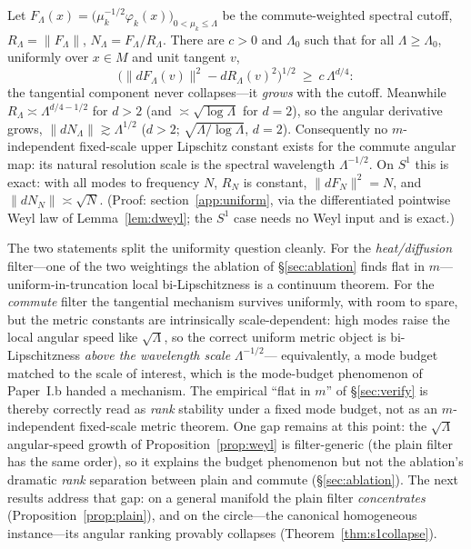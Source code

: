 \documentclass[review]{siamart220329}
\begin{document}
\begin{proposition}\label{prop:weyl}
Let $F_\Lambda(x)=\big(\mu_k^{-1/2}\varphi_k(x)\big)_{0<\mu_k\le\Lambda}$
be the commute-weighted spectral cutoff, $R_\Lambda=\lVert F_\Lambda\rVert$,
$N_\Lambda=F_\Lambda/R_\Lambda$. There are $c>0$ and $\Lambda_0$ such that for
all $\Lambda\ge\Lambda_0$, uniformly over $x\in M$ and unit tangent $v$,
\[
\big(\lVert dF_\Lambda(v)\rVert^2-dR_\Lambda(v)^2\big)^{1/2}\ \ge\ c\,\Lambda^{d/4}:
\]
the tangential component never collapses---it \emph{grows} with the cutoff.
Meanwhile $R_\Lambda\asymp\Lambda^{d/4-1/2}$ for $d>2$ (and
$\asymp\sqrt{\log\Lambda}$ for $d=2$), so the angular derivative grows,
$\lVert dN_\Lambda\rVert\gtrsim\Lambda^{1/2}$ ($d>2$;
$\sqrt{\Lambda/\log\Lambda}$, $d=2$). Consequently no $m$-independent
fixed-scale upper Lipschitz constant exists for the commute angular map: its
natural resolution scale is the spectral wavelength $\Lambda^{-1/2}$. On $S^1$
this is exact: with all modes to frequency $N$, $R_N$ is constant,
$\lVert dF_N\rVert^2=N$, and $\lVert dN_N\rVert\asymp\sqrt N$. (Proof:
section~\ref{app:uniform}, via the differentiated pointwise Weyl law of
Lemma~\ref{lem:dweyl}; the $S^1$ case needs no Weyl input and is exact.)
\end{proposition}

The two statements split the uniformity question cleanly. For the
\emph{heat/diffusion} filter---one of the two weightings the ablation of
\S\ref{sec:ablation} finds flat in $m$---uniform-in-truncation local
bi-Lipschitzness is a continuum theorem. For the \emph{commute} filter the
tangential mechanism survives uniformly, with room to spare, but the metric
constants are intrinsically scale-dependent: high modes raise the local
angular speed like $\sqrt\Lambda$, so the correct uniform metric object is
bi-Lipschitzness \emph{above the wavelength scale} $\Lambda^{-1/2}$---
equivalently, a mode budget matched to the scale of interest, which is the
mode-budget phenomenon of Paper~I.b handed a mechanism. The
empirical ``flat in $m$'' of \S\ref{sec:verify} is thereby correctly read as
\emph{rank} stability under a fixed mode budget, not as an $m$-independent
fixed-scale metric theorem. One gap remains at this point: the $\sqrt\Lambda$
angular-speed growth of Proposition~\ref{prop:weyl} is filter-generic (the
plain filter has the same order), so it explains the budget phenomenon but
not the ablation's dramatic \emph{rank} separation between plain and commute
(\S\ref{sec:ablation}). The next results address that gap: on a general manifold
the plain filter \emph{concentrates} (Proposition~\ref{prop:plain}), and on the
circle---the canonical homogeneous instance---its angular ranking provably
collapses (Theorem~\ref{thm:s1collapse}).
\end{document}
